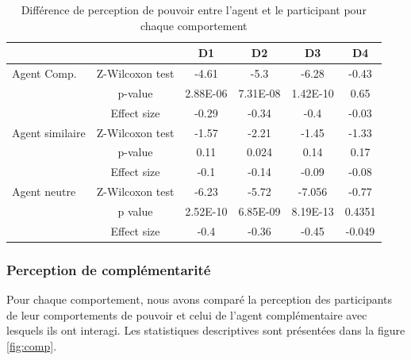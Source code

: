 	\begin{table}[t]
				\caption{Différence de perception de pouvoir entre l'agent et le participant pour chaque comportement} 
		\centering

		\begin{tabular}{ l c c c c c }
			\hline
			\textbf{ }& & \textbf{D1} & \textbf{D2} & \textbf{D3} & \textbf{D4} \\ 
			\hline
			
			\newline\multirow{3}{*} {Agent Comp.}  &  Z-Wilcoxon test  & -4.61 & -5.3 & -6.28 & -0.43 \\ 	
			\newline   & p-value & 2.88E-06 & 7.31E-08 & 1.42E-10 & 0.65 \\ 
			\newline   & Effect size & -0.29 & -0.34 & -0.4 & -0.03\\ 
			\hline
			
			\newline\multirow{3}{*} {Agent similaire}  &  Z-Wilcoxon test  & -1.57 & -2.21 & -1.45 & -1.33\\ 	
			\newline   & p-value & 0.11 & 0.024 & 0.14 & 0.17 \\ 
			\newline   & Effect size & -0.1 & -0.14& -0.09 & -0.08 \\ 
			\hline
			
				\newline\multirow{3}{*} {Agent neutre}  &  Z-Wilcoxon test  & -6.23 & -5.72 & -7.056 & -0.77\\ 	
				\newline   & p value & 2.52E-10 & 6.85E-09 & 8.19E-13 & 0.4351 \\ 
				\newline   & Effect size & -0.4 & -0.36 & -0.45 & -0.049 \\ 
				\hline
		
		\end{tabular}

		\label{tab:powPercption}
	\end{table}
	
	
	\subsubsection{Perception de complémentarité}
			
		Pour chaque comportement, nous avons comparé la perception des participants de leur comportements de pouvoir et celui de l'agent complémentaire avec lesquels ils ont interagi. Les statistiques descriptives sont présentées dans la figure \ref{fig:comp}. 
		
